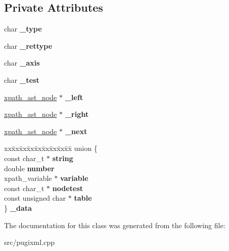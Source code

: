 \subsection*{Private Attributes}
\begin{DoxyCompactItemize}
\item 
\mbox{\label{classxpath__ast__node_ad285f423090a0aaee3c4126da65066d1}} 
char {\bfseries \+\_\+type}
\item 
\mbox{\label{classxpath__ast__node_ab84a640f3a0f00d4d611d8cdd1f5c029}} 
char {\bfseries \+\_\+rettype}
\item 
\mbox{\label{classxpath__ast__node_a97b21db6df156c37ef7f2e6f69478b77}} 
char {\bfseries \+\_\+axis}
\item 
\mbox{\label{classxpath__ast__node_a421f6ed5f666ced9d6fe3692e84d7b89}} 
char {\bfseries \+\_\+test}
\item 
\mbox{\label{classxpath__ast__node_ad229146ced94be21eb5e4921b43a7ebb}} 
\hyperlink{classxpath__ast__node}{xpath\+\_\+ast\+\_\+node} $\ast$ {\bfseries \+\_\+left}
\item 
\mbox{\label{classxpath__ast__node_ab3935ea7e83f4421b20840cd84f0b37d}} 
\hyperlink{classxpath__ast__node}{xpath\+\_\+ast\+\_\+node} $\ast$ {\bfseries \+\_\+right}
\item 
\mbox{\label{classxpath__ast__node_a10059a66ecff3384e175e00d9fa2afcd}} 
\hyperlink{classxpath__ast__node}{xpath\+\_\+ast\+\_\+node} $\ast$ {\bfseries \+\_\+next}
\item 
\mbox{\label{classxpath__ast__node_a4a44839b652d66262d384347c529c7c0}} 
\begin{tabbing}
xx\=xx\=xx\=xx\=xx\=xx\=xx\=xx\=xx\=\kill
union \{\\
\>const char\_t $\ast$ {\bfseries string}\\
\>double {\bfseries number}\\
\>xpath\_variable $\ast$ {\bfseries variable}\\
\>const char\_t $\ast$ {\bfseries nodetest}\\
\>const unsigned char $\ast$ {\bfseries table}\\
\} {\bfseries \_data}\\

\end{tabbing}\end{DoxyCompactItemize}


The documentation for this class was generated from the following file\+:\begin{DoxyCompactItemize}
\item 
src/pugixml.\+cpp\end{DoxyCompactItemize}
